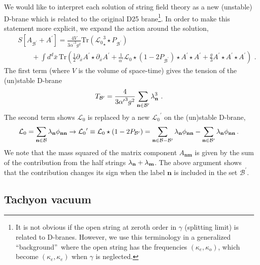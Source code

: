 \documentclass[a4paper,aps,preprint,nofootinbib,eqsecnum]{revtex4}
\begin{document}
We would like to interpret each solution of string field theory as a new
(unstable) D-brane which is related to the original D25 brane\footnote{%
It is not obvious if the open string at zeroth order in $\gamma $ (splitting
limit) is related to D-branes. However, we use this terminology in a
generalized \textquotedblleft background\textquotedblright\ where the open
string has the frequencies $(\kappa _{e},\kappa _{o})$, which become $%
(\kappa _{e},\kappa _{e})$ when $\gamma $ is neglected.}. In order to make
this statement more explicit, we expand the action around the solution,
\begin{eqnarray}
&&S[A_{\mathcal{B}^{\prime }}+A^{\prime }]=\frac{4V}{3{\alpha ^{\prime }}%
^{3}g^{2}}\mbox{Tr}\left( {\mathcal{L}_{0}}_{\star }^{3}\star P_{\mathcal{B}%
^{\prime }}\right)   \label{S_0} \\
&&\qquad +\int d^{d}\bar{x}\,\mbox{Tr}\left( \frac{1}{2}\partial _{\bar{x}%
}A^{\prime }\star \partial _{\bar{x}}A^{\prime }+\frac{1}{{\alpha ^{\prime }}%
}{\mathcal{L}_{0}}\star (1-2P_{\mathcal{B}^{\prime }})\star A^{\prime }\star
A^{\prime }+\frac{g}{3}A^{\prime }\star A^{\prime }\star A^{\prime }\right)
\,\,.
\end{eqnarray}%
The first term (where $V$ is the volume of space-time) gives the tension of
the (un)stable D-brane
\begin{equation}
T_{\mathcal{B}^{\prime }}=\frac{4}{3{\alpha ^{\prime }}^{3}g^{2}}\sum_{%
\mathbf{n}\in \mathcal{B}^{\prime }}\lambda _{\mathbf{n}}^{3}\,\,.
\end{equation}%
The second term shows ${\mathcal{L}_{0}}$ is replaced by a new ${\mathcal{L}%
_{0}}^{\prime }$ on the (un)stable D-brane,
\begin{equation}
{\mathcal{L}_{0}}=\sum_{\mathbf{n}\in \mathcal{B}}\lambda _{\mathbf{n}}\phi
_{\mathbf{nn}}\rightarrow {\mathcal{L}_{0}}^{\prime }\equiv {\mathcal{L}_{0}}%
\star (1-2P_{\mathcal{B}^{\prime }})=\sum_{\mathbf{n}\in \mathcal{B}-%
\mathcal{B}^{\prime }}\lambda _{\mathbf{n}}\phi _{\mathbf{nn}}-\sum_{\mathbf{%
n}\in \mathcal{B}^{\prime }}\lambda _{\mathbf{n}}\phi _{\mathbf{nn}}\,.
\end{equation}%
We note that the mass squared of the matrix component $A_{\mathbf{nm}}$ is
given by the sum of the contribution from the half strings $\lambda _{%
\mathbf{n}}+\lambda _{\mathbf{m}}$. The above argument shows that the
contribution changes its sign when the label $\mathbf{n}$ is included in the
set $\mathcal{B}^{\prime }$.

\subsection{Tachyon vacuum}
\end{document}
